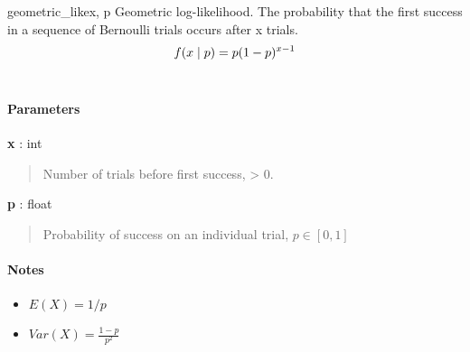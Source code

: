 \hypertarget{pymc.distributions.geometric_like}{}
\begin{funcdesc}{geometric\_like}{x, p}
Geometric log-likelihood. The probability that the first success in a
sequence of Bernoulli trials occurs after x trials.
\begin{gather}
\begin{split}f(x \mid p) = p(1-p)^{x-1}\end{split}\notag\\\begin{split}\end{split}\notag
\end{gather}
\paragraph{Parameters}
\begin{paramlist}
\item[] \textbf{x} : int
\begin{quote}

Number of trials before first success, \textgreater{} 0.
\end{quote}

\item[] \textbf{p} : float
\begin{quote}

Probability of success on an individual trial, $p \in [0,1]$
\end{quote}
\end{paramlist}
\paragraph{Notes}
\begin{itemize}
\item {} 
$E(X)=1/p$

\item {} 
$Var(X)=\frac{1-p}{p^2}$

\end{itemize}
\end{funcdesc}

